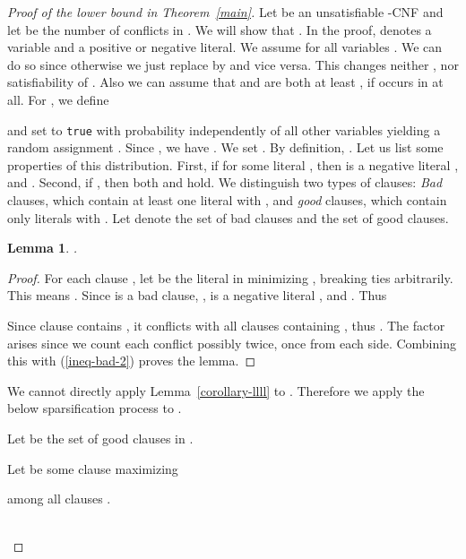 \documentclass[a4paper, 11pt]{article}
\newtheorem{lemma}[theorem]{Lemma}
\begin{document}
\begin{proof}[Proof of the lower bound in Theorem~\ref{main}]
  Let  be an unsatisfiable -CNF and let  be the number of
  conflicts in . We will show that . In the proof,  denotes a variable and
   a positive or negative literal.  We assume  for all variables . We can do so since otherwise we
  just replace  by  and vice versa. This changes neither
  , nor satisfiability of . Also we can assume that
   and  are both at least , if 
  occurs in  at all. For , we define
  
  and set  to \texttt{true} with probability  independently
  of all other variables yielding a random assignment . Since
  , we have . We set . By definition, .  Let us list some
  properties of this distribution.  First, if  for
  some literal , then  is a negative literal , and
  . Second,
  if , then both
   and
   hold.
  We distinguish two types of clauses: {\em Bad} clauses, which
  contain at least one literal  with , and {\em
    good} clauses, which contain only literals  with .
Let  denote the set of bad clauses and  the set of good clauses.
  

  \begin{lemma}
   .
   \label{prop-bad}
  \end{lemma}
  \begin{proof}
    For each clause , let  be the literal in
     minimizing , breaking ties arbitrarily. This means
    . Since  is a
    bad clause, ,  is a negative literal
    , and .
    Thus
    
    Since clause  contains , it conflicts with all
     clauses containing , thus .  The factor  arises
    since we count each conflict possibly twice, once from each side.
    Combining this with (\ref{ineq-bad-2}) proves the lemma.
  \end{proof}


  We cannot directly apply Lemma~\ref{corollary-llll} to .
  Therefore we apply the below sparsification process to .
\begin{algorithm}[h]
\SetTitleSty{}{}
Let 
be the set of good clauses in .\\
\vspace{1mm}
 \While{}
 {
   \vspace{1mm}
   Let  be some clause maximizing 
   
   among all clauses .\\
   \vspace{1mm}
   \\
   
}
\end{algorithm}
\end{proof}
\end{document}
